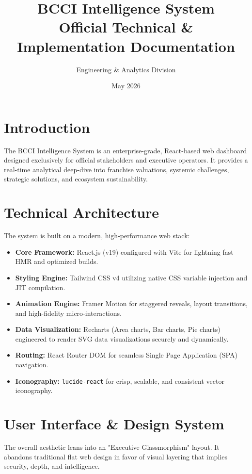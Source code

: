 \documentclass[12pt,a4paper]{article}
\title{
    \vspace{2cm}
    \textbf{\Huge BCCI Intelligence System}\\
    \vspace{0.5cm}
    \Large Official Technical \& Implementation Documentation
}
\author{Engineering \& Analytics Division}
\date{May 2026}
\begin{document}
\maketitle
\thispagestyle{empty}
\newpage

\tableofcontents
\newpage

\section{Introduction}
The BCCI Intelligence System is an enterprise-grade, React-based web dashboard designed exclusively for official stakeholders and executive operators. It provides a real-time analytical deep-dive into franchise valuations, systemic challenges, strategic solutions, and ecosystem sustainability. 

\section{Technical Architecture}
The system is built on a modern, high-performance web stack:
\begin{itemize}[label=\textcolor{brandgold}{\textbullet}]
    \item \textbf{Core Framework:} React.js (v19) configured with Vite for lightning-fast HMR and optimized builds.
    \item \textbf{Styling Engine:} Tailwind CSS v4 utilizing native CSS variable injection and JIT compilation.
    \item \textbf{Animation Engine:} Framer Motion for staggered reveals, layout transitions, and high-fidelity micro-interactions.
    \item \textbf{Data Visualization:} Recharts (Area charts, Bar charts, Pie charts) engineered to render SVG data visualizations securely and dynamically.
    \item \textbf{Routing:} React Router DOM for seamless Single Page Application (SPA) navigation.
    \item \textbf{Iconography:} \texttt{lucide-react} for crisp, scalable, and consistent vector iconography.
\end{itemize}

\section{User Interface \& Design System}
The overall aesthetic leans into an "Executive Glassmorphism" layout. It abandons traditional flat web design in favor of visual layering that implies security, depth, and intelligence.
\end{document}
